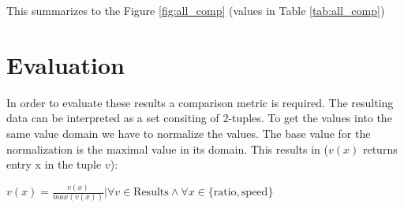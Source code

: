 \documentclass[
	12pt,
	a4paper,
	BCOR10mm,
	DIV14,
	listof=totoc,
	bibliography=totoc,
	headsepline
]{scrreprt}
\begin{document}
\FloatBarrier








\FloatBarrier


This summarizes to the Figure \ref{fig:all_comp} (values in Table \ref{tab:all_comp})

\FloatBarrier

\section{Evaluation}
In order to evaluate these results a comparison metric is required.
The resulting data can be interpreted as a set consiting of 2-tuples.
To get the values into the same value domain we have to normalize the values.
The base value for the normalization is the maximal value in its domain.
This results in (\(v(x)\) returns entry x in the tuple \(v\)):
\begin{center}
	\(
	   v(x) = \frac{v(x)}{max(v(x))}|\forall v \in \text{Results} \land \forall x \in \{\text{ratio}, \text{speed}\}
	\)
\end{center}
\end{document}
